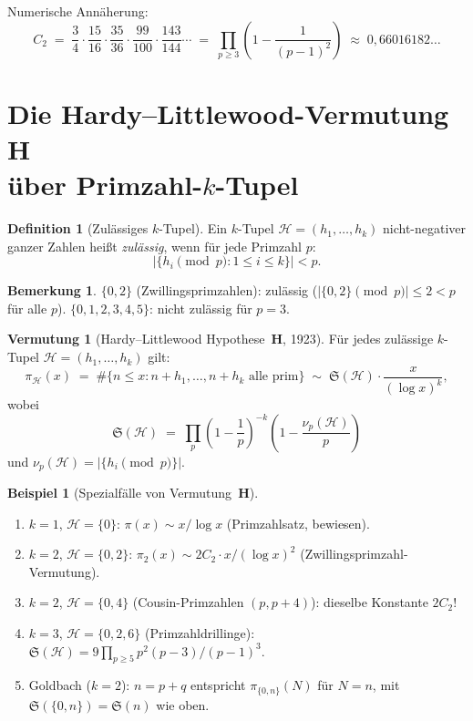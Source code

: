 \documentclass[12pt,a4paper]{amsart}
\theoremstyle{definition}
\newtheorem{definition}[theorem]{Definition}
\newtheorem{bemerkung}[theorem]{Bemerkung}
\newtheorem{vermutung}[theorem]{Vermutung}
\newtheorem{beispiel}[theorem]{Beispiel}
\begin{document}
Numerische Annäherung:
\[
  C_2 \;=\; \frac{3}{4} \cdot \frac{15}{16} \cdot \frac{35}{36} \cdot \frac{99}{100}
       \cdot \frac{143}{144} \cdots
  \;=\; \prod_{p \geq 3} \left(1 - \frac{1}{(p-1)^2}\right)
  \;\approx\; 0{,}66016182\ldots
\]

\section{Die Hardy--Littlewood-Vermutung~$\mathbf{H}$\\
         über Primzahl-$k$-Tupel}
\label{sec:ktuples}

\begin{definition}[Zulässiges $k$-Tupel]
  Ein $k$-Tupel $\mathcal{H} = (h_1, \ldots, h_k)$ nicht-negativer ganzer Zahlen
  heißt \emph{zulässig}, wenn für jede Primzahl $p$:
  \[
    \bigl|\{h_i \pmod p : 1 \leq i \leq k\}\bigr| < p.
  \]
\end{definition}

\begin{bemerkung}
  $\{0, 2\}$ (Zwillingsprimzahlen): zulässig ($|\{0,2\} \pmod p| \leq 2 < p$
  für alle $p$).  $\{0, 1, 2, 3, 4, 5\}$: nicht zulässig für $p = 3$.
\end{bemerkung}

\begin{vermutung}[Hardy--Littlewood Hypothese~$\mathbf{H}$, 1923]\label{verm:H}
  Für jedes zulässige $k$-Tupel $\mathcal{H} = (h_1, \ldots, h_k)$ gilt:
  \[
    \pi_{\mathcal{H}}(x)
    \;=\; \#\bigl\{n \leq x : n+h_1, \ldots, n+h_k \text{ alle prim}\bigr\}
    \;\sim\; \mathfrak{S}(\mathcal{H}) \cdot \frac{x}{(\log x)^k},
  \]
  wobei
  \[
    \mathfrak{S}(\mathcal{H})
    \;=\; \prod_p \left(1-\frac{1}{p}\right)^{-k} \left(1-\frac{\nu_p(\mathcal{H})}{p}\right)
  \]
  und $\nu_p(\mathcal{H}) = |\{h_i \pmod p\}|$.
\end{vermutung}

\begin{beispiel}[Spezialfälle von Vermutung~$\mathbf{H}$]
  \begin{enumerate}
    \item $k=1$, $\mathcal{H}=\{0\}$:
      $\pi(x) \sim x/\log x$ (Primzahlsatz, bewiesen).
    \item $k=2$, $\mathcal{H}=\{0,2\}$:
      $\pi_2(x) \sim 2C_2 \cdot x/(\log x)^2$ (Zwillingsprimzahl-Vermutung).
    \item $k=2$, $\mathcal{H}=\{0,4\}$ (Cousin-Primzahlen $(p,p+4)$):
      dieselbe Konstante $2C_2$!
    \item $k=3$, $\mathcal{H}=\{0,2,6\}$ (Primzahldrillinge):
      $\mathfrak{S}(\mathcal{H}) = 9 \prod_{p \geq 5} p^2(p-3)/(p-1)^3$.
    \item Goldbach ($k=2$): $n = p+q$ entspricht $\pi_{\{0,n\}}(N)$ für $N=n$,
      mit $\mathfrak{S}(\{0,n\}) = \mathfrak{S}(n)$ wie oben.
  \end{enumerate}
\end{beispiel}
\end{document}
